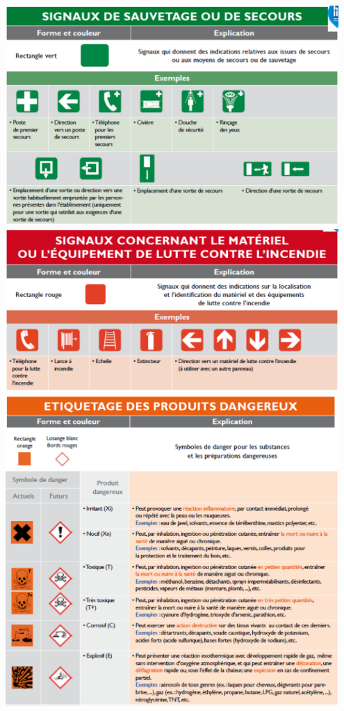 \documentclass[a4paper]{article}
\begin{document}
\begin{center}
\includegraphics[width=0.95\textwidth]{images/signaux4.PNG}
\includegraphics[width=0.95\textwidth]{images/signaux5.PNG}
\includegraphics[width=0.95\textwidth]{images/signaux6.PNG}

\end{center}
\end{document}
